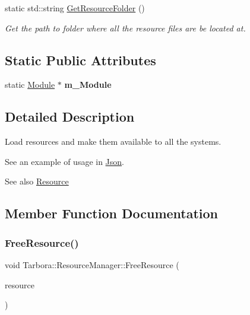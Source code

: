 \begin{DoxyCompactItemize}
\mbox{\label{classTarbora_1_1ResourceManager_a302419fdf0455a322394fcd7fb754593}} 
static std\+::string \hyperlink{classTarbora_1_1ResourceManager_a302419fdf0455a322394fcd7fb754593}{Get\+Resource\+Folder} ()
\begin{DoxyCompactList}\small\item\em Get the path to folder where all the resource files are be located at. \end{DoxyCompactList}\end{DoxyCompactItemize}
\subsection*{Static Public Attributes}
\begin{DoxyCompactItemize}
\item 
\mbox{\label{classTarbora_1_1ResourceManager_a5c0cc274d57c723fab4621216eb45a84}} 
static \hyperlink{classTarbora_1_1Module}{Module} $\ast$ {\bfseries m\+\_\+\+Module}
\end{DoxyCompactItemize}


\subsection{Detailed Description}
Load resources and make them available to all the systems. 

See an example of usage in \hyperlink{classTarbora_1_1Json}{Json}. \begin{DoxySeeAlso}{See also}
\hyperlink{classTarbora_1_1Resource}{Resource} 
\end{DoxySeeAlso}


\subsection{Member Function Documentation}
\mbox{\label{classTarbora_1_1ResourceManager_a7267c1da4dc124b41f34b6c870fdb10e}} 
\subsubsection{\texorpdfstring{Free\+Resource()}{FreeResource()}}
{\footnotesize\ttfamily void Tarbora\+::\+Resource\+Manager\+::\+Free\+Resource (\begin{DoxyParamCaption}\item[{Resource\+Ptr}]{resource }\end{DoxyParamCaption})\hspace{0.3cm}{\ttfamily [static]}}



